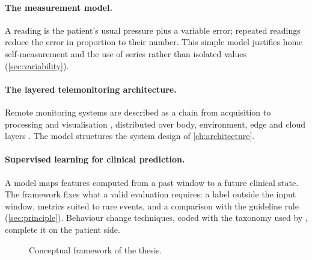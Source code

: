 \paragraph{The measurement model.} A reading is the patient's usual pressure plus a variable error; repeated readings reduce the error in proportion to their number. This simple model justifies home self-measurement and the use of series rather than isolated values (\cref{sec:variability}).

\paragraph{The layered telemonitoring architecture.} Remote monitoring systems are described as a chain from acquisition to processing and visualisation \parencite{tai2024}, distributed over body, environment, edge and cloud layers \parencite{mucchi2021}. The model structures the system design of \cref{ch:architecture}.

\paragraph{Supervised learning for clinical prediction.} A model maps features computed from a past window to a future clinical state. The framework fixes what a valid evaluation requires: a label outside the input window, metrics suited to rare events, and a comparison with the guideline rule (\cref{sec:principle}). Behaviour change techniques, coded with the taxonomy used by \textcite{zhou2024}, complete it on the patient side.

\begin{figure}[htbp]
\centering
{}
\caption{Conceptual framework of the thesis.}\label{fig:concept-framework}
\end{figure}

